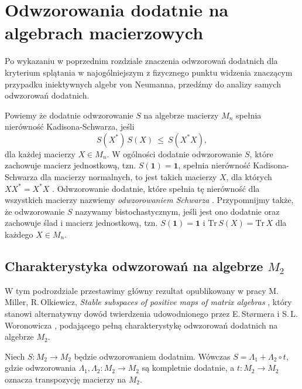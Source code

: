 \chapter{Odwzorowania dodatnie na algebrach macierzowych}
\label{chp:M3notes}

Po wykazaniu w poprzednim rozdziale znaczenia odwzorowań dodatnich dla kryterium
splątania w najogólniejszym z fizycznego punktu widzenia znaczącym przypadku
iniektywnych algebr von Neumanna, przedźmy do analizy samych odwzorowań dodatnich.

Powiemy że dodatnie odwzorowanie $S$ na algebrze macierzy $M_{n}$ spełnia nierówność
Kadisona-Schwarza, jeśli
\begin{equation}
\label{eq:SchwarzInequality}
    S(X^{*}) \, S(X) \: \leq \: S(X^{*} X),
\end{equation}
dla każdej macierzy $X \in M_{n}$.
W ogólności dodatnie odwzorowanie $S$, które zachowuje macierz jednostkową,
tzn. $S(\mathbf{1}) = \mathbf{1}$,
spełnia nierówność Kadisona-Schwarza dla macierzy normalnych,
to jest takich macierzy
$X$, dla których  $X X^{*} = X^{*} X$
\cite{choi1974some}.
Odwzorowanie dodatnie, które spełnia tę nierówność dla wszystkich macierzy
nazwiemy \emph{odwzorowaniem Schwarza} \cite{robertson1983schwarz}.
Przypomnijmy także, że odwzorowanie $S$ nazywamy bistochastycznym,
jeśli jest ono dodatnie oraz zachowuje ślad i macierz jednostkową,
tzn.
$S(\mathbf{1}) = \mathbf{1}$
i
$\text{Tr} \, S(X) = \text{Tr} \, X$
dla każdego $X \in M_{n}$.


\section{Charakterystyka odwzorowań na algebrze $M_{2}$}
\label{sec:M2notes}

W tym podrozdziale przestawimy główny rezultat opublikowany w pracy
M.\,Miller, R.\,Olkiewicz, \emph{Stable subspaces of positive maps of matrix algebras}
\cite{miller2015stable},
który stanowi alternatywny dowód twierdzenia udowodnionego przez
E.\,St{\o}rmera \cite{stormer1963positive}
i S.\,L.\,Woronowicza \cite{woronowicz1976positive},
podającego pełną charakterystykę odwzorowań dodatnich na algebrze $M_{2}$.

\begin{Theorem}
\label{thm:PositiveMapsOnM2}
    Niech $S:M_{2} \rightarrow M_{2}$ będzie odwzorowaniem dodatnim.
    Wówczas $S = \Lambda_{1}  + \Lambda_{2} \circ t$,
    gdzie odwzorowania
    $\Lambda_{1}, \Lambda_{2}:M_{2} \rightarrow M_{2}$
    są kompletnie dodatnie, a
    $t: M_{2} \rightarrow M_{2}$ oznacza transpozycję macierzy na $M_{2}$.
\end{Theorem}

